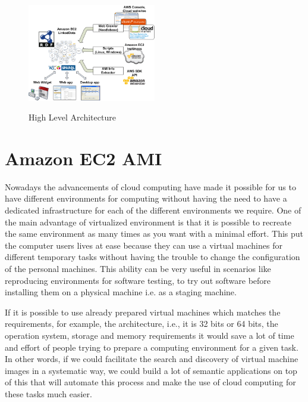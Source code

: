 \begin{figure}[h!t!]
  \caption{High Level Architecture}
  \centering
    \includegraphics[width=0.5\textwidth]{EC2LD.png}
   \label{fig:architecture}
\end{figure}

\section{Amazon EC2 AMI}\label{sec:ec2}

Nowadays the advancements of cloud computing have made it possible for us to have different environments for computing without having the need to have a dedicated infrastructure for each of the different environments we require. One of the main advantage of virtualized environment is that it is possible to recreate the same environment as many times as you want with a minimal effort. This put the computer users lives at ease because they can use a virtual machines for different temporary tasks without having the trouble to change the configuration of the personal machines. This ability can be very useful in scenarios like reproducing environments for software testing, to try out software before installing them on a physical machine i.e. as a staging machine. 

If it is possible to use already prepared virtual machines which matches the requirements, for example, the architecture, i.e., it is 32 bits or 64 bits, the operation system, storage and memory requirements it would save a lot of time and effort of people trying to prepare a computing environment for a given task. In other words, if we could facilitate the search and discovery of virtual machine images in a systematic way, we could build a lot of semantic applications on top of this that will automate this process and make the use of cloud computing for these tasks much easier. 


